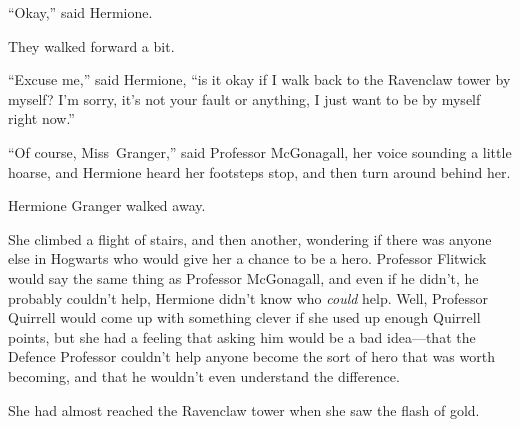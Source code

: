 “Okay,” said Hermione.

They walked forward a bit.

“Excuse me,” said Hermione, “is it okay if I walk back to the Ravenclaw tower by myself? I’m sorry, it’s not your fault or anything, I just want to be by myself right now.”

“Of course, Miss~Granger,” said Professor McGonagall, her voice sounding a little hoarse, and Hermione heard her footsteps stop, and then turn around behind her.

Hermione Granger walked away.

She climbed a flight of stairs, and then another, wondering if there was anyone else in Hogwarts who would give her a chance to be a hero. Professor Flitwick would say the same thing as Professor McGonagall, and even if he didn’t, he probably couldn’t help, Hermione didn’t know who \emph{could} help. Well, Professor Quirrell would come up with something clever if she used up enough Quirrell points, but she had a feeling that asking him would be a bad idea—that the Defence Professor couldn’t help anyone become the sort of hero that was worth becoming, and that he wouldn’t even understand the difference.

She had almost reached the Ravenclaw tower when she saw the flash of gold.

